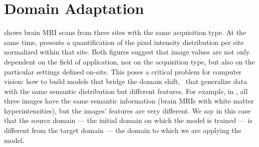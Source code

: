 
\section{Domain Adaptation}\label{sec:domain_adaptation}


 shows brain MRI scans from three sites with the same acquisition type. At the same time,  presents a quantification of the pixel intensity distribution per site normalized within that site. Both figures suggest that image values are not only dependent on the field of application, nor on the acquisition type, but also on the particular settings defined on-site. This poses a critical problem for computer vision: how to build models that bridge the domain shift, \ie~that generalize data with the same semantic distribution but different features. For example, in , all three images have the same semantic information (brain MRIs with white matter hyperintensities), but the images' features are very different. We say in this case that the source domain --- the initial domain on which the model is trained --- is different from the target domain --- the domain to which we are applying the model.


